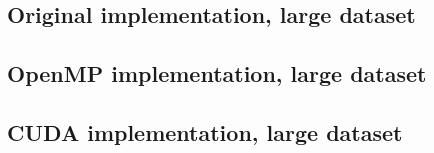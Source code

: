 \documentclass[11pt]{article}
\begin{document}
\subsection{Original implementation, large dataset}

\subsection{OpenMP implementation, large dataset}

\subsection{CUDA implementation, large dataset}

\end{document}
